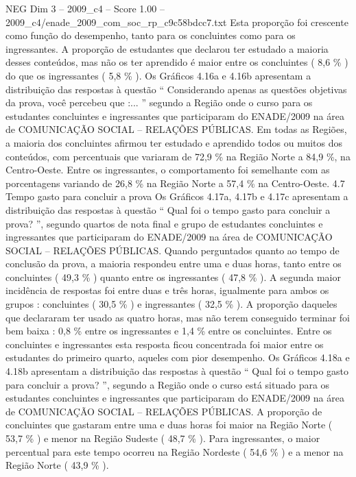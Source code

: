 \begin{textsample}{NEG Dim 3 – 2009\_c4 – Score 1.00 – 2009\_c4/enade\_2009\_com\_soc\_rp\_c9c58bdcc7.txt}
Esta proporção foi crescente como função do desempenho, tanto para os concluintes como para os ingressantes.
A proporção de estudantes que declarou ter estudado a maioria desses conteúdos, mas não os ter aprendido é maior entre os concluintes ( 8,6 \% ) do que os ingressantes ( 5,8 \% ).
Os Gráficos 4.16a e 4.16b apresentam a distribuição das respostas à questão “ Considerando apenas as questões objetivas da prova, você percebeu que :... ” segundo a Região onde o curso para os estudantes concluintes e ingressantes que participaram do ENADE/2009 na área de COMUNICAÇÃO SOCIAL – RELAÇÕES PÚBLICAS.
Em todas as Regiões, a maioria dos concluintes afirmou ter estudado e aprendido todos ou muitos dos conteúdos, com percentuais que variaram de 72,9 \% na Região Norte a 84,9 \%, na Centro-Oeste.
Entre os ingressantes, o comportamento foi semelhante com as porcentagens variando de 26,8 \% na Região Norte a 57,4 \% na Centro-Oeste. 4.7 Tempo gasto para concluir a prova Os Gráficos 4.17a, 4.17b e 4.17c apresentam a distribuição das respostas à questão “ Qual foi o tempo gasto para concluir a prova? ”, segundo quartos de nota final e grupo de estudantes concluintes e ingressantes que participaram do ENADE/2009 na área de COMUNICAÇÃO SOCIAL – RELAÇÕES PÚBLICAS.
Quando perguntados quanto ao tempo de conclusão da prova, a maioria respondeu entre uma e duas horas, tanto entre os concluintes ( 49,3 \% ) quanto entre os ingressantes ( 47,8 \% ).
A segunda maior incidência de respostas foi entre duas e três horas, igualmente para ambos os grupos : concluintes ( 30,5 \% ) e ingressantes ( 32,5 \% ).
A proporção daqueles que declararam ter usado as quatro horas, mas não terem conseguido terminar foi bem baixa : 0,8 \% entre os ingressantes e 1,4 \% entre os concluintes.
Entre os concluintes e ingressantes esta resposta ficou concentrada foi maior entre os estudantes do primeiro quarto, aqueles com pior desempenho.
Os Gráficos 4.18a e 4.18b apresentam a distribuição das respostas à questão “ Qual foi o tempo gasto para concluir a prova? ”, segundo a Região onde o curso está situado para os estudantes concluintes e ingressantes que participaram do ENADE/2009 na área de COMUNICAÇÃO SOCIAL – RELAÇÕES PÚBLICAS.
A proporção de concluintes que gastaram entre uma e duas horas foi maior na Região Norte ( 53,7 \% ) e menor na Região Sudeste ( 48,7 \% ).
Para ingressantes, o maior percentual para este tempo ocorreu na Região Nordeste ( 54,6 \% ) e a menor na Região Norte ( 43,9 \% ).

\end{textsample}
